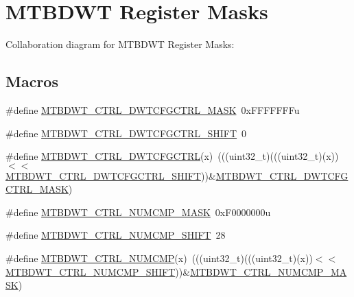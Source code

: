 \hypertarget{group___m_t_b_d_w_t___register___masks}{}\section{M\+T\+B\+D\+WT Register Masks}
\label{group___m_t_b_d_w_t___register___masks}
Collaboration diagram for M\+T\+B\+D\+WT Register Masks\+:
\subsection*{Macros}
\begin{DoxyCompactItemize}
\item 
\#define \hyperlink{group___m_t_b_d_w_t___register___masks_ga9e40278e7b92b2e6b986112b6e2dddc3}{M\+T\+B\+D\+W\+T\+\_\+\+C\+T\+R\+L\+\_\+\+D\+W\+T\+C\+F\+G\+C\+T\+R\+L\+\_\+\+M\+A\+SK}~0x\+F\+F\+F\+F\+F\+F\+Fu
\item 
\#define \hyperlink{group___m_t_b_d_w_t___register___masks_gad6dd05558d41419cb9f877533730598a}{M\+T\+B\+D\+W\+T\+\_\+\+C\+T\+R\+L\+\_\+\+D\+W\+T\+C\+F\+G\+C\+T\+R\+L\+\_\+\+S\+H\+I\+FT}~0
\item 
\#define \hyperlink{group___m_t_b_d_w_t___register___masks_ga751a2e34d1e0f6ef6c755be288a29451}{M\+T\+B\+D\+W\+T\+\_\+\+C\+T\+R\+L\+\_\+\+D\+W\+T\+C\+F\+G\+C\+T\+RL}(x)~(((uint32\+\_\+t)(((uint32\+\_\+t)(x))$<$$<$\hyperlink{group___m_t_b_d_w_t___register___masks_gad6dd05558d41419cb9f877533730598a}{M\+T\+B\+D\+W\+T\+\_\+\+C\+T\+R\+L\+\_\+\+D\+W\+T\+C\+F\+G\+C\+T\+R\+L\+\_\+\+S\+H\+I\+FT}))\&\hyperlink{group___m_t_b_d_w_t___register___masks_ga9e40278e7b92b2e6b986112b6e2dddc3}{M\+T\+B\+D\+W\+T\+\_\+\+C\+T\+R\+L\+\_\+\+D\+W\+T\+C\+F\+G\+C\+T\+R\+L\+\_\+\+M\+A\+SK})
\item 
\#define \hyperlink{group___m_t_b_d_w_t___register___masks_ga846eb798600a6cbb83fb5343120b87e6}{M\+T\+B\+D\+W\+T\+\_\+\+C\+T\+R\+L\+\_\+\+N\+U\+M\+C\+M\+P\+\_\+\+M\+A\+SK}~0x\+F0000000u
\item 
\#define \hyperlink{group___m_t_b_d_w_t___register___masks_ga8ae4e5abf11db57b34a826de0cd5e562}{M\+T\+B\+D\+W\+T\+\_\+\+C\+T\+R\+L\+\_\+\+N\+U\+M\+C\+M\+P\+\_\+\+S\+H\+I\+FT}~28
\item 
\#define \hyperlink{group___m_t_b_d_w_t___register___masks_ga97447cbbfbb879c90c4072c4c4086254}{M\+T\+B\+D\+W\+T\+\_\+\+C\+T\+R\+L\+\_\+\+N\+U\+M\+C\+MP}(x)~(((uint32\+\_\+t)(((uint32\+\_\+t)(x))$<$$<$\hyperlink{group___m_t_b_d_w_t___register___masks_ga8ae4e5abf11db57b34a826de0cd5e562}{M\+T\+B\+D\+W\+T\+\_\+\+C\+T\+R\+L\+\_\+\+N\+U\+M\+C\+M\+P\+\_\+\+S\+H\+I\+FT}))\&\hyperlink{group___m_t_b_d_w_t___register___masks_ga846eb798600a6cbb83fb5343120b87e6}{M\+T\+B\+D\+W\+T\+\_\+\+C\+T\+R\+L\+\_\+\+N\+U\+M\+C\+M\+P\+\_\+\+M\+A\+SK})

\end{DoxyCompactItemize}
